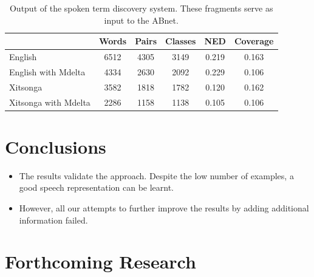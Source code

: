 \documentclass[final]{beamer}
\newcommand{\abnet}{{\sc ABnet}}
\begin{document}
\begin{frame}[t]
\begin{multicols}{3}
\begin{table}[h]
\caption{\label{tab:std-stats} Output of the spoken term discovery system. These fragments serve as input to the \abnet{}.}
\small
\begin{tabular}{lccccc}
\hline
         & Words & Pairs & Classes & NED   & Coverage \\
\hline
English & 6512 & 4305 & 3149 & 0.219 & 0.163 \\
English with Mdelta & 4334 & 2630 & 2092 & 0.229 & 0.106 \\
Xitsonga & 3582 & 1818 & 1782 & 0.120 & 0.162 \\
Xitsonga with Mdelta & 2286 & 1158 & 1138 &  0.105 & 0.106 \\
\hline
\end{tabular}
\end{table}



\section{Conclusions}

\begin{itemize}
\item The results validate the approach. Despite the low number of examples, a good speech representation can be learnt.\\
\item However, all our attempts to further improve the results by adding additional information failed.
\end{itemize}



\section{Forthcoming Research}


\end{multicols}
\end{frame}
\end{document}
